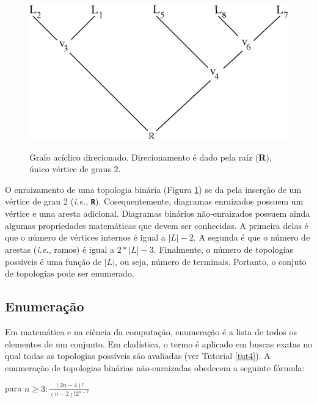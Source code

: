 \begin{refsection}
  \begin{figure}[H]
  \centering
      {\includegraphics[scale=0.60]{figures/tut3/directed_graph.eps}}
      {\caption[\textit{Gráfos}]{Grafo acíclico direcionado. Direcionamento é dado pela raíz (\textbf{R}), único vértice de graus 2.}\label{tut3:fig:rooted_graph}}
  \end{figure}

	
	O enraizamento de uma topologia binária (Figura \ref{tut3:fig:rooted_graph}) se da pela inserção de um vértice de grau 2 (\textit{i.e.}, \textbf{\texttt{R}}). Cosequentemente, diagramas enraizados possuem um vértice e uma aresta adicional. Diagramas binários não-enraizados possuem ainda algumas propriedades matemáticas que devem ser conhecidas. A primeira delas é que o número de vértices internos é igual a $|L|-2$. A segunda é que o número de arestas (\textit{i.e.}, ramos) é igual a $2*|L|-3$. Finalmente, o número de topologias possíveis é uma função de $|L|$, ou seja, número de terminais. Portanto, o conjuto de topologias pode ser enumerado.
	
\subsection{Enumeração}\label{tut3:context:enumeration}
	Em matemática e na ciência da computação, enumeração é a lista de todos os elementos de um conjunto. Em cladística, o termo é aplicado em buscas exatas no qual todas as topologias possíveis são avaliadas (ver Tutorial \ref{tut4}). A enumeração de topologias binárias não-enraizadas obedecem a seguinte fórmula:

\begin{center}
	para $n\geq3\colon\frac{(2n-4)!}{(n-2)!2^{n-2}}$
\end{center}
	

\end{refsection}
